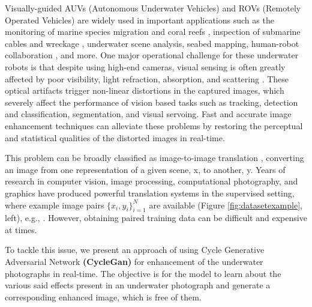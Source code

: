 \documentclass[a4paper]{article}
\begin{document}
Visually-guided AUVs (Autonomous Underwater Vehicles) and ROVs (Remotely Operated Vehicles) are widely used in important applications such as the monitoring of marine species migration and coral reefs \cite{6385685}, inspection of submarine cables and wreckage \cite{Bingham2010RoboticTF}, underwater scene analysis, seabed mapping, human-robot collaboration \cite{https://doi.org/10.1002/rob.21837}, and more. One major operational challenge for these underwater robots is that despite using high-end cameras, visual sensing is often greatly affected by poor visibility, light refraction, absorption, and scattering \cite{lu2013underwaterimage,zhang2017underwaterimage,https://doi.org/10.1002/rob.21837}. These optical artifacts trigger non-linear distortions in the captured images, which severely affect the performance of vision based tasks such as tracking, detection and classification, segmentation, and visual servoing. Fast and accurate image enhancement techniques can alleviate these problems by restoring the perceptual and statistical qualities \cite{8460552,zhang2017underwaterimage} of the distorted images in real-time.

This problem can be broadly classified as image-to-image translation \cite{isola2018imagetoimage}, converting an image from one representation of a given scene, x, to another, y. Years of research in computer vision, image processing, computational photography, and graphics have produced powerful translation systems in the supervised setting, where example image pairs $\{x_i, y_i\}_{i=1}^N$ are available (Figure \ref{fig:datasetexample}, left), e.g., \cite{eigen2015predicting,10.1145/383259.383295,isola2018imagetoimage,johnson2016perceptual,Laffont14,long2015fully,shih2013data,wang2016generative,xie2015holisticallynested,zhang2016colorful}. However, obtaining paired training data can be difficult and expensive at times.

To tackle this issue, we present an approach of using Cycle Generative Adversarial Network \textbf{(CycleGan)} for enhancement of the underwater photographs in real-time. The objective is for the model to learn about the various said effects present in an underwater photograph and generate a corresponding enhanced image, which is free of them.
\end{document}
